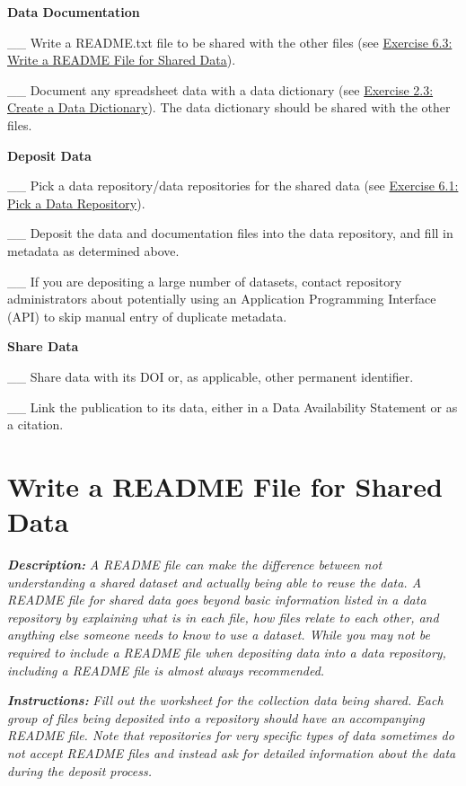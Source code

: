 \documentclass[
]{book}
\begin{document}
\textbf{Data Documentation}

\_\_ Write a README.txt file to be shared with the other files (see \protect\hyperlink{readme-sharing}{Exercise 6.3: Write a README File for Shared Data}).

\_\_ Document any spreadsheet data with a data dictionary (see \protect\hyperlink{data-dictionary}{Exercise 2.3: Create a Data Dictionary}). The data dictionary should be shared with the other files.

\textbf{Deposit Data}

\_\_ Pick a data repository/data repositories for the shared data (see \protect\hyperlink{data-repository}{Exercise 6.1: Pick a Data Repository}).

\_\_ Deposit the data and documentation files into the data repository, and fill in metadata as determined above.

\_\_ If you are depositing a large number of datasets, contact repository administrators about potentially using an Application Programming Interface (API) to skip manual entry of duplicate metadata.

\textbf{Share Data}

\_\_ Share data with its DOI or, as applicable, other permanent identifier.

\_\_ Link the publication to its data, either in a Data Availability Statement or as a citation.

\hypertarget{readme-sharing}{%
\section{Write a README File for Shared Data}\label{readme-sharing}}

\textbf{\emph{Description:}} \emph{A README file can make the difference between not understanding a shared dataset and actually being able to reuse the data. A README file for shared data goes beyond basic information listed in a data repository by explaining what is in each file, how files relate to each other, and anything else someone needs to know to use a dataset. While you may not be required to include a README file when depositing data into a data repository, including a README file is almost always recommended.}

\textbf{\emph{Instructions:}} \emph{Fill out the worksheet for the collection data being shared. Each group of files being deposited into a repository should have an accompanying README file. Note that repositories for very specific types of data sometimes do not accept README files and instead ask for detailed information about the data during the deposit process.}
\end{document}
